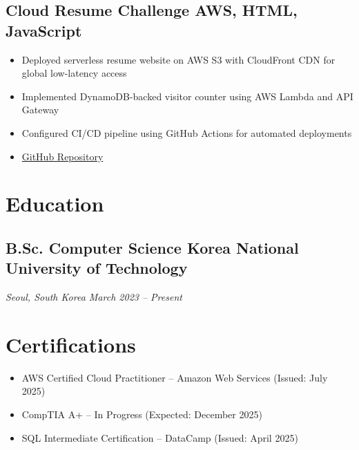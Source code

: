 \documentclass[a4paper,10pt]{article}
\begin{document}
\subsection*{Cloud Resume Challenge \hfill AWS, HTML, JavaScript}
\begin{itemize}
    \item Deployed serverless resume website on AWS S3 with CloudFront CDN for global low-latency access
    \item Implemented DynamoDB-backed visitor counter using AWS Lambda and API Gateway
    \item Configured CI/CD pipeline using GitHub Actions for automated deployments
    \item \href{https://github.com/minjunkim/cloud-resume}{GitHub Repository}
\end{itemize}

\section*{Education}
\subsection*{B.Sc. Computer Science \hfill Korea National University of Technology}
\textit{Seoul, South Korea \hfill March 2023 -- Present}

\section*{Certifications}
\begin{itemize}[leftmargin=*,nosep]
    \item AWS Certified Cloud Practitioner -- Amazon Web Services (Issued: July 2025)
    \item CompTIA A+ -- In Progress (Expected: December 2025)
    \item SQL Intermediate Certification -- DataCamp (Issued: April 2025)
\end{itemize}
\end{document}

